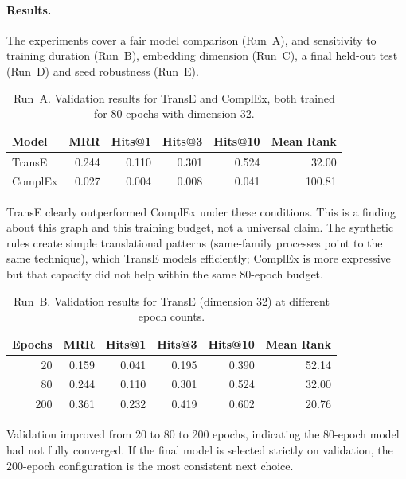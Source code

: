 \documentclass{article}
\begin{document}
\paragraph{Results.} The experiments cover a fair model comparison (Run~A), and
sensitivity to training duration (Run~B), embedding dimension (Run~C), a final
held-out test (Run~D) and seed robustness (Run~E).

\begin{table}[h]
\centering
\begin{tabular}{lrrrrr}
\toprule
\textbf{Model} & \textbf{MRR} & \textbf{Hits@1} & \textbf{Hits@3} & \textbf{Hits@10} & \textbf{Mean Rank} \\
\midrule
TransE & 0.244 & 0.110 & 0.301 & 0.524 & 32.00 \\
ComplEx & 0.027 & 0.004 & 0.008 & 0.041 & 100.81 \\
\bottomrule
\end{tabular}
\caption{Run~A. Validation results for TransE and ComplEx, both trained for 80 epochs with dimension 32.}
\end{table}

TransE clearly outperformed ComplEx under these conditions. This is a finding
about this graph and this training budget, not a universal claim. The synthetic
rules create simple translational patterns (same-family processes point to the
same technique), which TransE models efficiently; ComplEx is more expressive but
that capacity did not help within the same 80-epoch budget.

\begin{table}[h]
\centering
\begin{tabular}{rrrrrr}
\toprule
\textbf{Epochs} & \textbf{MRR} & \textbf{Hits@1} & \textbf{Hits@3} & \textbf{Hits@10} & \textbf{Mean Rank} \\
\midrule
20 & 0.159 & 0.041 & 0.195 & 0.390 & 52.14 \\
80 & 0.244 & 0.110 & 0.301 & 0.524 & 32.00 \\
200 & 0.361 & 0.232 & 0.419 & 0.602 & 20.76 \\
\bottomrule
\end{tabular}
\caption{Run~B. Validation results for TransE (dimension 32) at different epoch counts.}
\end{table}

Validation improved from 20 to 80 to 200 epochs, indicating the 80-epoch model
had not fully converged. If the final model is selected strictly on validation,
the 200-epoch configuration is the most consistent next choice.
\end{document}
